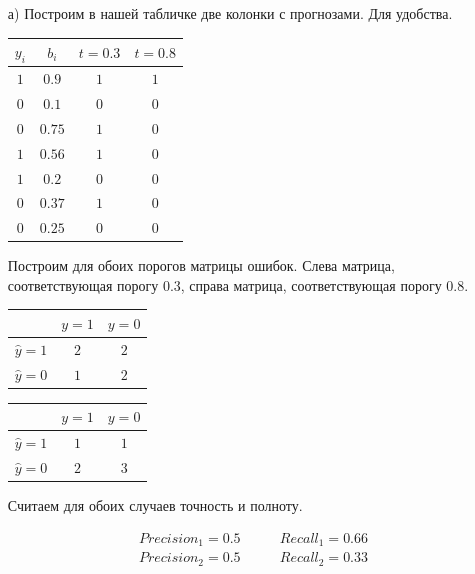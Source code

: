 \documentclass[12pt, a4paper, oneside]{article}
\theoremstyle{plain} %
\theoremstyle{definition}
\begin{document}
\begin{solution}
	\begin{enumerate}
		\item[а)]  Построим в нашей табличке две колонки с прогнозами. Для удобства. 
		
		\begin{center}
			\begin{tabular}{c|c|c|c}
				$y_i$ & $b_i$ & $t=0.3$  & $t=0.8$\\
				\hline
				$1$  & $0.9$ & $1$ & $1$ \\
				$0$ & $0.1$ & $0$ & $0$\\
				$0$ & $0.75$ & $1$ & $0$\\
				$1$ & $0.56$ & $1$ & $0$\\
				$1$ & $0.2$ & $0$ & $0$ \\
				$0$ & $0.37$ & $1$ & $0$\\
				$0$ & $0.25$ & $0$ & $0$ \\		
			\end{tabular}
		\end{center}
		
		Построим для обоих порогов матрицы ошибок. Слева матрица, соответствующая порогу $0.3$, справа матрица, соответствующая порогу $0.8$.
		
		\begin{minipage}[t]{0.45\textwidth}
			\begin{tabular}{|c|c|c|}
				\hline
				& $y=1$  &  $ y = 0$ \\  \hline 
				$\hat y = 1$  &   $2$ &    $2$ \\      \hline 
				$\hat y = 0$ &   $1$ &    $2$ \\      \hline 
			\end{tabular}
		\end{minipage}
		\begin{minipage}[t]{0.45\textwidth}
			\begin{tabular}{|c|c|c|}
				\hline
				& $y=1$  &  $ y = 0$ \\  \hline 
				$\hat y = 1$  &   $1$ &    $1$ \\      \hline 
				$\hat y = 0$ &   $2$ &    $3$ \\      \hline 
			\end{tabular}
		\end{minipage}
		
		Считаем для обоих случаев точность и полноту. 
		
		\begin{equation} 
		\begin{aligned}
		&Precision_1 = 0.5     \qquad &Recall_1 = 0.66  \\ 
		&Precision_2 = 0.5  \qquad &Recall_2 =  0.33   \\ 
		\end{aligned}
		\end{equation} 
		

\end{enumerate}
\end{solution}
\end{document}
